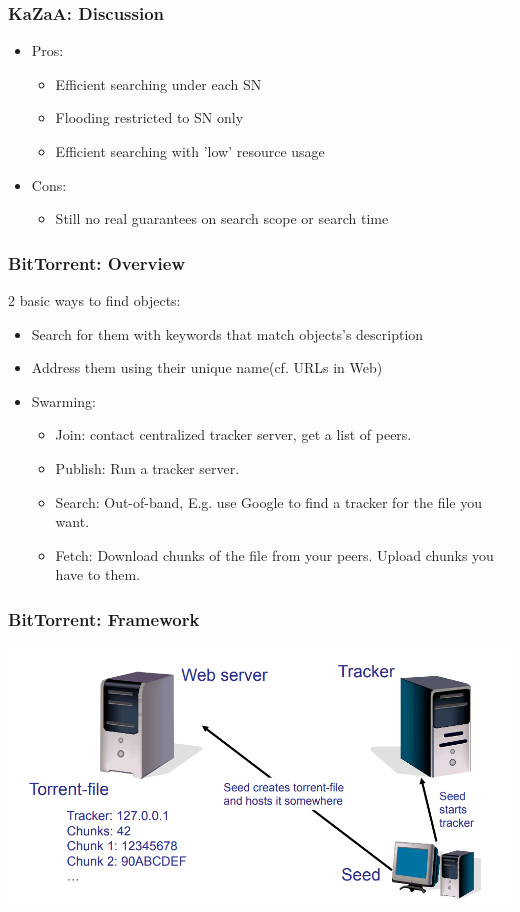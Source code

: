 \begin{frame}
    \frametitle{KaZaA: Discussion}
    \begin{itemize}
        \item Pros:
        \begin{itemize}
            \item Efficient searching under each SN
            \item Flooding restricted to SN only
            \item Efficient searching with 'low' resource usage
        \end{itemize}
        \item Cons:
        \begin{itemize}
            \item Still no real guarantees on search scope or search time
        \end{itemize}
    \end{itemize}
\end{frame}

\begin{frame}
    \frametitle{BitTorrent: Overview}
    2 basic ways to find objects: \\
    \begin{itemize}
        \item Search for them with keywords that match objects's description
        \item Address them using their unique name(cf. URLs in Web)
    \end{itemize}
    \begin{itemize}
        \item Swarming:
        \begin{itemize}
            \item Join: contact centralized tracker server, get a list of peers.
            \item Publish: Run a tracker server.
            \item Search: Out-of-band, E.g. use Google to find a tracker for the file you want.
            \item Fetch: Download chunks of the file from your peers. Upload chunks you have to them.
        \end{itemize}
    \end{itemize}
\end{frame}

\begin{frame}
    \frametitle{BitTorrent: Framework}
    \includegraphics[scale=0.3]{figures/bittorrent.png}
\end{frame}

